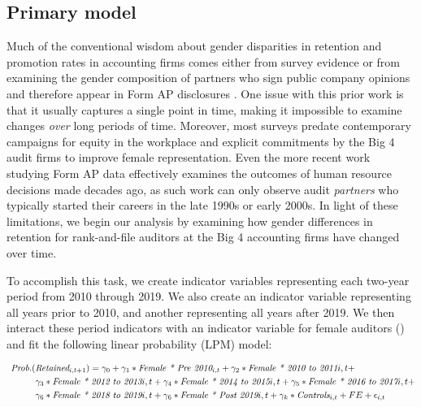 \documentclass[11pt]{article}
\begin{document}
    \subsection{Primary model}\label{section:byperiod}
        Much of the conventional wisdom about gender disparities in retention and promotion rates in accounting firms comes either from survey evidence \parencite{kornbergerChangingGenderDomination2010,daltonWomenManagersPartners1997, anderson-goughHelpingThemForget2005} or from examining the gender composition of partners who sign public company opinions and therefore appear in Form AP disclosures \parencite{rapoportWomenRarelyRun2018, burkeAuditPartnerIdentification2019}. One issue with this prior work is that it usually captures a single point in time, making it impossible to examine changes \textit{over} long periods of time. Moreover, most surveys predate contemporary campaigns for equity in the workplace and explicit commitments by the Big 4 audit firms to improve female representation. Even the more recent work studying Form AP data effectively examines the outcomes of human resource decisions made decades ago, as such work can only observe audit \textit{partners} who typically started their careers in the late 1990s or early 2000s. In light of these limitations, we begin our analysis by examining how gender differences in retention for rank-and-file auditors at the Big 4 accounting firms have changed over time. 

        To accomplish this task, we create indicator variables representing each two-year period from 2010 through 2019. We also create an indicator variable representing all years prior to 2010, and another representing all years after 2019. We then interact these period indicators with an indicator variable for female auditors (\FEMALE) and fit the following linear probability (LPM) model: 

        \vspace{-6ex}
        \begin{align}\label{eq:primaryModel}
            \textit{ Prob.}(&\textit{Retained}_{i,t+1})= \gamma_0+\gamma_1*\textit{Female * Pre 2010}_{i,t} + \gamma_2*\textit{Female * 2010 to 2011}{i,t}+ \\ 
                            &\gamma_3*\textit{Female * 2012 to 2013}{i,t} + \gamma_4*\textit{Female * 2014 to 2015}{i,t} + \gamma_5*\textit{Female * 2016 to 2017}{i,t} + \nonumber\\
                            &\gamma_6*\textit{Female * 2018 to 2019}{i,t} + \gamma_6*\textit{Female * Post 2019}{i,t} + \gamma_k*\textit{Controls}_{i,t} + FE + \epsilon_{i,t}\nonumber
        \end{align}
\end{document}
